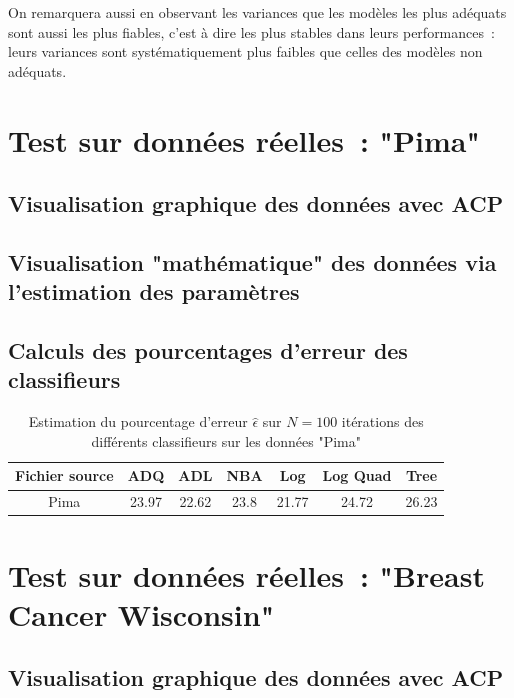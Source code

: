 \documentclass[a4paper,10pt]{report}
\begin{document}
On remarquera aussi en observant les variances que les modèles les plus adéquats sont aussi les plus fiables, c'est à dire les plus stables dans leurs performances~: leurs variances sont systématiquement plus faibles que celles des modèles non adéquats.

\section{Test sur données réelles~: "Pima"}

\subsection{Visualisation graphique des données avec ACP}


\subsection{Visualisation "mathématique" des données via l'estimation des paramètres}



\subsection{Calculs des pourcentages d'erreur des classifieurs}
\begin{table}[H]
	\centering
	\captionsetup{justification=centering, margin=4cm}
	\begin{tabular}{c|c|c|c|c|c|c}
		Fichier source & ADQ & ADL & NBA & Log & Log Quad & Tree \\ 
		\hline
		Pima & 23.97 & 22.62 & 23.8 & 21.77 & 24.72 & 26.23  \\ 
	\end{tabular}
	\caption{\small Estimation du pourcentage d'erreur $\hat{\epsilon}$ sur $N=100$ itérations des différents classifieurs sur les données "Pima"}
	\label{table:2-1-erreur-data-pima}
\end{table}

\section{Test sur données réelles~: "Breast Cancer Wisconsin"}

\subsection{Visualisation graphique des données avec ACP}
\end{document}
